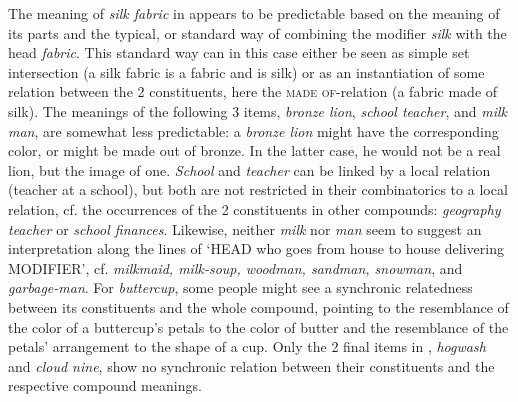The meaning of \emph{silk fabric} in \Last[a] appears to be
predictable based on the meaning of its parts and the typical, or
standard way of combining the modifier \emph{silk} with the
head \emph{fabric}. This standard way can in this case either be seen
as simple set intersection (a silk fabric is a fabric and is silk) or
as an instantiation of some relation between the 2 constituents,
here the \textsc{made of}-relation (a fabric made of silk).
The meanings
of the following 3 items, \emph{bronze lion}, \emph{school
  teacher}, and \emph{milk man}, are somewhat less predictable: a
\emph{bronze lion} might have the corresponding color, or might be
made out of bronze. In the latter case, he would not be a real lion,
but the image of one. \emph{School} and \emph{teacher} can be linked
by a local relation (teacher at a school), but both are not restricted in their combinatorics to a local
relation, cf. the occurrences of the 2 constituents in other compounds: \emph{geography teacher} or \emph{school
  finances}. Likewise, neither \emph{milk} nor \emph{man} seem to
suggest an interpretation along the lines of `HEAD who goes from house
to house delivering MODIFIER', cf. \emph{milkmaid, milk-soup, woodman,
  sandman, snowman}, and \emph{garbage-man}.
For \emph{buttercup}, some people might see a synchronic
relatedness between its constituents and the whole compound, pointing to the resemblance of the color of a buttercup's petals to the color of butter and the resemblance of the petals' arrangement to the shape of a cup.
Only the 2 final items in \Last,  \emph{hogwash} and \emph{cloud
  nine}, show no synchronic relation between their constituents and
the respective compound meanings.


